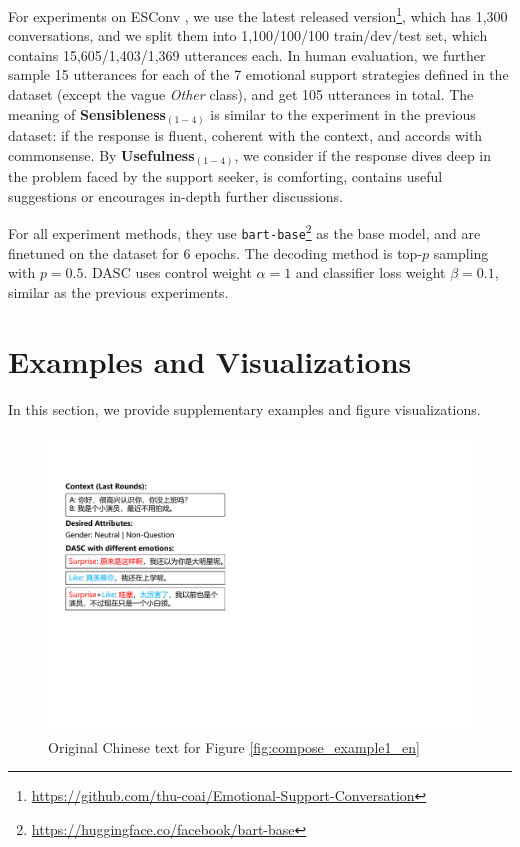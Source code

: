 For experiments on ESConv \citep{liu2021towards}, we use the latest released version\footnote{\url{https://github.com/thu-coai/Emotional-Support-Conversation}}, which has 1,300 conversations, and we split them into 1,100/100/100 train/dev/test set, which contains 15,605/1,403/1,369 utterances each. In human evaluation, we further sample 15 utterances for each of the 7 emotional support strategies defined in the dataset (except the vague \textit{Other} class), and get 105 utterances in total. The meaning of \textbf{Sensibleness}$_{(1-4)}$ is similar to the experiment in the previous dataset: if the response is fluent, coherent with the context, and accords with commonsense. By \textbf{Usefulness}$_{(1-4)}$, we consider if the response dives deep in the problem faced by the support seeker, is comforting, contains useful suggestions or encourages in-depth further discussions. 

For all experiment methods, they use \texttt{bart-base}\footnote{\url{https://huggingface.co/facebook/bart-base}} as the base model, and are finetuned on the dataset for 6 epochs. The decoding method is top-$p$ sampling with $p=0.5$. DASC uses control weight $\alpha=1$ and classifier loss weight $\beta=0.1$, similar as the previous experiments.

\section{Examples and Visualizations}

In this section, we provide supplementary examples and figure visualizations. 

\begin{figure}[ht]
    \centering
    \includegraphics[width=1.0\columnwidth]{figures/compose_example1_zh.pdf}
    \caption{Original Chinese text for Figure \ref{fig:compose_example1_en}}
    \label{fig:compose_example1_zh}
\end{figure}

